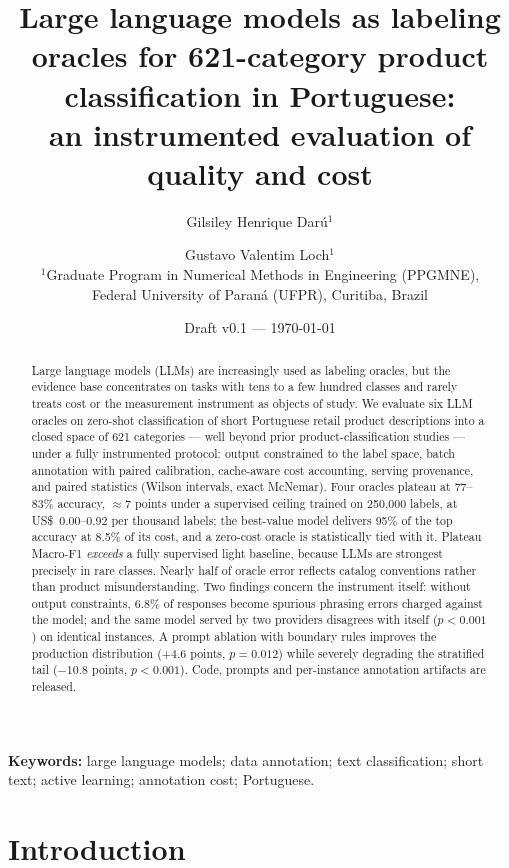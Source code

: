 \documentclass[11pt]{article}
\title{Large language models as labeling oracles for 621-category product
classification in Portuguese:\\ an instrumented evaluation of quality and cost}
\author{Gilsiley Henrique Darú$^{1}$ \and Gustavo Valentim Loch$^{1}$\\[2pt]
\normalsize $^{1}$Graduate Program in Numerical Methods in Engineering (PPGMNE),\\
\normalsize Federal University of Paraná (UFPR), Curitiba, Brazil}
\date{Draft v0.1 --- \today}
\begin{document}
\maketitle

\begin{abstract}
Large language models (LLMs) are increasingly used as labeling oracles, but
the evidence base concentrates on tasks with tens to a few hundred classes
and rarely treats cost or the measurement instrument as objects of study.
We evaluate six LLM oracles on zero-shot classification of short Portuguese
retail product descriptions into a closed space of 621 categories --- well
beyond prior product-classification studies --- under a fully instrumented
protocol: output constrained to the label space, batch annotation with
paired calibration, cache-aware cost accounting, serving provenance, and
paired statistics (Wilson intervals, exact McNemar). Four oracles plateau
at 77--83\% accuracy, $\approx 7$ points under a supervised ceiling trained
on 250{,}000 labels, at US\$~0.00--0.92 per thousand labels; the
best-value model delivers 95\% of the top accuracy at 8.5\% of its cost,
and a zero-cost oracle is statistically tied with it. Plateau Macro-F1
\emph{exceeds} a fully supervised light baseline, because LLMs are
strongest precisely in rare classes. Nearly half of oracle error reflects
catalog conventions rather than product misunderstanding. Two findings
concern the instrument itself: without output constraints, 6.8\% of
responses become spurious phrasing errors charged against the model; and
the same model served by two providers disagrees with itself ($p<0.001$)
on identical instances. A prompt ablation with boundary rules improves the
production distribution ($+4.6$ points, $p=0.012$) while severely
degrading the stratified tail ($-10.8$ points, $p<0.001$). Code, prompts
and per-instance annotation artifacts are released.
\end{abstract}

\noindent\textbf{Keywords:} large language models; data annotation; text
classification; short text; active learning; annotation cost; Portuguese.

\section{Introduction}
\label{sec:intro}
\end{document}
